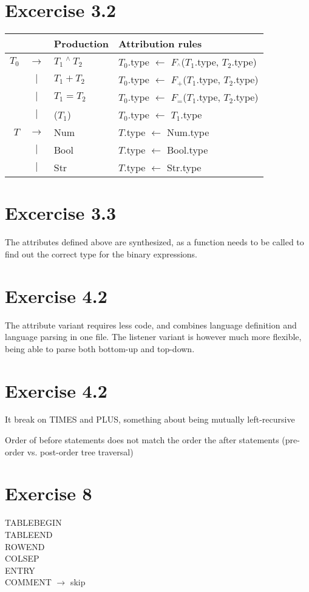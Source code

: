 \documentclass[11pt]{article} %
\begin{document}
\section*{Excercise 3.2}
\noindent
\begin{tabular}{|rcl|l|}
\hline
&& \textbf{Production} & \textbf{Attribution rules} \\\hline
$T_0$ & $\rightarrow$ & $T_1 ~^\wedge ~T_2$ & $T_0$.type $\leftarrow$ $F_{^\wedge}$($T_1$.type, $T_2$.type) \\
& $|$ & $T_1 + T_2$ & $T_0$.type $\leftarrow$ $F_+$($T_1$.type, $T_2$.type) \\
& $|$ & $T_1 = T_2$ & $T_0$.type $\leftarrow$ $F_=$($T_1$.type, $T_2$.type) \\
& $|$ & ($T_1$) & $T_0$.type $\leftarrow$ $T_1$.type \\
$T$ & $\rightarrow$ & Num & $T$.type $\leftarrow$ Num.type \\
& $|$ & Bool & $T$.type $\leftarrow$ Bool.type \\
& $|$ & Str & $T$.type $\leftarrow$ Str.type \\
\hline
\end{tabular}

\section*{Excercise 3.3}

The attributes defined above are synthesized, as a function needs to be called to find out the correct type for the binary expressions.


\section*{Exercise 4.2}
The attribute variant requires less code, and combines language definition and language parsing in one file. The listener variant is however much more flexible, being able to parse both bottom-up and top-down.

\section*{Exercise 4.2}
It break on TIMES and PLUS, something about being mutually left-recursive

Order of before statements does not match the order the after statements (pre-order vs. post-order tree traversal)

\section*{Exercise 8}
TABLEBEGIN \\
TABLEEND \\
ROWEND \\
COLSEP \\
ENTRY \\
COMMENT $\rightarrow$ skip
\end{document}
